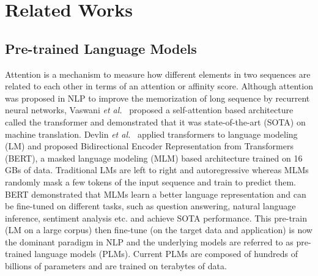 \documentclass[journal]{vgtc}                %
\begin{document}



\section{Related Works}

\subsection{Pre-trained Language Models}
Attention is a mechanism to measure how different elements in two sequences are related to each other in terms of an attention or affinity score. Although attention was proposed in NLP to improve the memorization of long sequence by recurrent neural networks, Vaswani \MakeLowercase{\textit{et al.}}~\cite{vaswani2017attention} proposed a self-attention based architecture called the transformer and demonstrated that it was state-of-the-art (SOTA) on machine translation. Devlin \MakeLowercase{\textit{et al.}}~\cite{devlin2019bert} applied transformers to language modeling (LM) and proposed Bidirectional Encoder Representation from Transformers (BERT), a masked language modeling (MLM) based architecture trained on 16 GBs of data. Traditional LMs are left to right and autoregressive whereas MLMs randomly mask a few tokens of the input sequence and train to predict them. BERT demonstrated that MLMs learn a better language representation and can be fine-tuned on different tasks, such as question answering, natural language inference, sentiment analysis etc. and achieve SOTA performance. This pre-train (LM on a large corpus) then fine-tune (on the target data and application) is now the dominant paradigm in NLP and the underlying models are referred to as pre-trained language models (PLMs). Current PLMs are composed of hundreds of billions of parameters and are trained on terabytes of data.  
\end{document}
